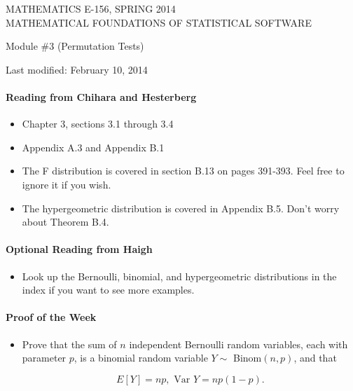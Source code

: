 \documentclass[12pt]{article}
\begin{document}
\begin{center}
MATHEMATICS E-156, SPRING 2014 \\
MATHEMATICAL FOUNDATIONS OF STATISTICAL SOFTWARE

\smallskip

Module \#3 (Permutation Tests)
\end{center}

Last modified: February 10, 2014

\medskip

\paragraph*{Reading from Chihara and Hesterberg}

\begin{itemize}
\item Chapter 3, sections 3.1 through 3.4

\item Appendix A.3 and Appendix B.1

\item The F distribution is covered in section B.13 on pages 391-393. Feel free to ignore it if you wish.

\item The hypergeometric distribution is covered in Appendix B.5. Don't worry about Theorem B.4.

\end{itemize}

\paragraph*{Optional Reading from Haigh}

\begin{itemize}
\item Look up the Bernoulli, binomial, and hypergeometric distributions in the index if you want to see more examples.
\end{itemize}


\paragraph*{Proof of the Week}
\begin{itemize}
\item Prove that the sum of $n$ independent Bernoulli random variables, each with parameter $p$, is a binomial random variable $ Y \sim$ Binom$(n,p)$, and that

$$E[Y] = np, \text{ Var }Y = np(1-p).$$
\end{itemize}
\end{document}
